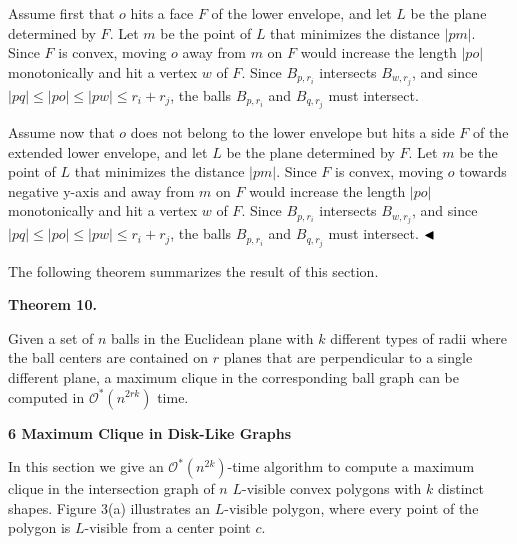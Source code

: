 \documentclass[10pt,a4paper]{amsart}
\begin{document}
\par
\par
Assume first that $o$ hits a face $F$ of the lower envelope, and let $L$ be the plane determined by $F$. Let $m$ be the point of $L$ that minimizes the distance $|pm|$. Since $F$ is convex, moving $o$ away from $m$ on $F$ would increase the length $|po|$ monotonically and hit a vertex $w$ of $F$. Since $B_{p,r_{i}}$ intersects $B_{w,r_{j}}$, and since $|pq|\leq|po|\leq|pw|\leq r_{i}+r_{j}$, the balls $B_{p,r_{i}}$ and $B_{q,r_{j}}$ must intersect.
\par
\par
Assume now that $o$ does not belong to the lower envelope but hits a side $F$ of the extended lower envelope, and let $L$ be the plane determined by $F$. Let $m$ be the point of $L$ that minimizes the distance $|pm|$. Since $F$ is convex, moving $o$ towards negative y-axis and away from $m$ on $F$ would increase the length $|po|$ monotonically and hit a vertex $w$ of $F$. Since $B_{p,r_{i}}$ intersects $B_{w,r_{j}}$, and since $|pq|\leq|po|\leq|pw|\leq r_{i}+r_{j}$, the balls $B_{p,r_{i}}$ and $B_{q,r_{j}}$ must intersect. $\hfill\blacktriangleleft$
\par
\par
The following theorem summarizes the result of this section.
\par
\par
\par\medskip\noindent\textbf{Theorem 10.}\par
Given a set of $n$ balls in the Euclidean plane with $k$ different types of radii where the ball centers are contained on $r$ planes that are perpendicular to a single different plane, a maximum clique in the corresponding ball graph can be computed in $\mathcal{O}^{*}(n^{2rk})$ time.
\par
\par
\par
\par
\par
\par\medskip\noindent\textbf{6 Maximum Clique in Disk-Like Graphs}\par
In this section we give an $\mathcal{O}^{*}(n^{2k})$-time algorithm to compute a maximum clique in the intersection graph of $n$ $L$-visible convex polygons with $k$ distinct shapes. Figure 3(a) illustrates an $L$-visible polygon, where every point of the polygon is $L$-visible from a center point $c$.
\par
\par
\end{document}
